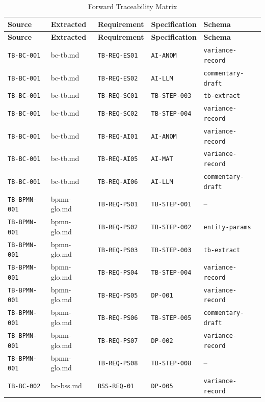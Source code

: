 \documentclass[11pt,a4paper,twoside]{report}
\newcommand{\srcref}[1]{\texttt{#1}}
\newcommand{\reqref}[1]{\texttt{#1}}
\newcommand{\specref}[1]{\texttt{#1}}
\newcommand{\schemaref}[1]{\texttt{#1}}
\begin{document}
\begin{longtable}{@{}C{2cm}C{2.2cm}C{2.5cm}C{2.5cm}C{2.5cm}@{}}
\caption{Forward Traceability Matrix}
\label{tab:forward-traceability} \\
\toprule
\textbf{Source} & \textbf{Extracted} & \textbf{Requirement} & \textbf{Specification} & \textbf{Schema} \\
\midrule
\endfirsthead
\toprule
\textbf{Source} & \textbf{Extracted} & \textbf{Requirement} & \textbf{Specification} & \textbf{Schema} \\
\midrule
\endhead
\srcref{TB-BC-001} & bc-tb.md & \reqref{TB-REQ-ES01} & \specref{AI-ANOM} & \schemaref{variance-record} \\
\srcref{TB-BC-001} & bc-tb.md & \reqref{TB-REQ-ES02} & \specref{AI-LLM} & \schemaref{commentary-draft} \\
\srcref{TB-BC-001} & bc-tb.md & \reqref{TB-REQ-SC01} & \specref{TB-STEP-003} & \schemaref{tb-extract} \\
\srcref{TB-BC-001} & bc-tb.md & \reqref{TB-REQ-SC02} & \specref{TB-STEP-004} & \schemaref{variance-record} \\
\srcref{TB-BC-001} & bc-tb.md & \reqref{TB-REQ-AI01} & \specref{AI-ANOM} & \schemaref{variance-record} \\
\srcref{TB-BC-001} & bc-tb.md & \reqref{TB-REQ-AI05} & \specref{AI-MAT} & \schemaref{variance-record} \\
\srcref{TB-BC-001} & bc-tb.md & \reqref{TB-REQ-AI06} & \specref{AI-LLM} & \schemaref{commentary-draft} \\
\srcref{TB-BPMN-001} & bpmn-glo.md & \reqref{TB-REQ-PS01} & \specref{TB-STEP-001} & -- \\
\srcref{TB-BPMN-001} & bpmn-glo.md & \reqref{TB-REQ-PS02} & \specref{TB-STEP-002} & \schemaref{entity-params} \\
\srcref{TB-BPMN-001} & bpmn-glo.md & \reqref{TB-REQ-PS03} & \specref{TB-STEP-003} & \schemaref{tb-extract} \\
\srcref{TB-BPMN-001} & bpmn-glo.md & \reqref{TB-REQ-PS04} & \specref{TB-STEP-004} & \schemaref{variance-record} \\
\srcref{TB-BPMN-001} & bpmn-glo.md & \reqref{TB-REQ-PS05} & \specref{DP-001} & \schemaref{variance-record} \\
\srcref{TB-BPMN-001} & bpmn-glo.md & \reqref{TB-REQ-PS06} & \specref{TB-STEP-005} & \schemaref{commentary-draft} \\
\srcref{TB-BPMN-001} & bpmn-glo.md & \reqref{TB-REQ-PS07} & \specref{DP-002} & \schemaref{variance-record} \\
\srcref{TB-BPMN-001} & bpmn-glo.md & \reqref{TB-REQ-PS08} & \specref{TB-STEP-008} & -- \\
\srcref{TB-BC-002} & bc-bss.md & \reqref{BSS-REQ-01} & \specref{DP-005} & \schemaref{variance-record} \\
\bottomrule
\end{longtable}
\end{document}
